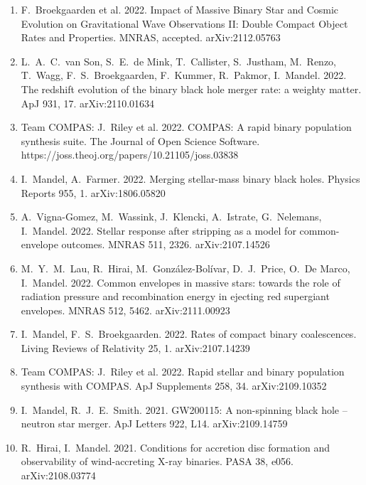 \documentclass[margin,line]{res}
\begin{document}
\begin{resume}
\begin{enumerate}
\item F.~Broekgaarden et al.  2022.  Impact of Massive Binary Star and Cosmic Evolution on Gravitational Wave Observations II: Double Compact Object Rates and Properties.  MNRAS, accepted.  arXiv:2112.05763

\item L.~A.~C.~van Son, S.~E.~de Mink, T.~Callister, S.~Justham, M.~Renzo, T.~Wagg, F.~S.~Broekgaarden, F.~Kummer, R.~Pakmor, I.~Mandel.  2022.  The redshift evolution of the binary black hole merger rate: a weighty matter.  ApJ 931, 17.  arXiv:2110.01634 

\item Team COMPAS: J.~Riley et al. 2022.  COMPAS: A rapid binary population synthesis suite.  The Journal of Open Science Software.  https://joss.theoj.org/papers/10.21105/joss.03838

\item I.~Mandel, A.~Farmer.  2022.  Merging stellar-mass binary black holes.  Physics Reports 955, 1.  arXiv:1806.05820

\item A.~Vigna-Gomez, M.~Wassink, J.~Klencki, A.~Istrate, G.~Nelemans, I.~Mandel.  2022. Stellar response after stripping as a model for common-envelope outcomes. MNRAS 511, 2326.  arXiv:2107.14526

\item M.~Y.~M.~Lau, R.~Hirai, M.~Gonz\'alez-Bol\'ivar, D.~J.~Price, O.~De Marco, I.~Mandel. 2022. Common envelopes in massive stars: towards the role of radiation pressure and recombination energy in ejecting red supergiant envelopes. MNRAS 512, 5462.  arXiv:2111.00923

\item I.~Mandel, F.~S.~Broekgaarden. 2022. Rates of compact binary coalescences.  Living Reviews of Relativity 25, 1.  arXiv:2107.14239

\item Team COMPAS: J.~Riley et al. 2022.  Rapid stellar and binary population synthesis with COMPAS.  ApJ Supplements 258, 34.  arXiv:2109.10352

\item I.~Mandel, R.~J.~E.~Smith.  2021.  GW200115: A non-spinning black hole -- neutron star merger.  ApJ Letters 922, L14. arXiv:2109.14759

\item R.~Hirai, I.~Mandel. 2021. Conditions for accretion disc formation and observability of wind-accreting X-ray binaries. PASA 38, e056.  arXiv:2108.03774 


\end{enumerate}
\end{resume}
\end{document}
